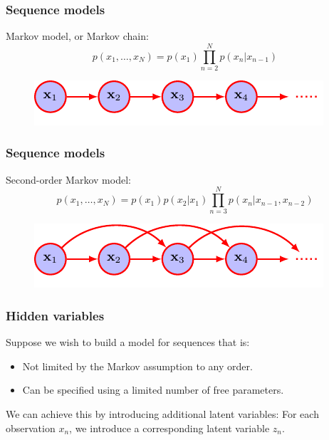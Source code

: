 \documentclass{beamer}
\begin{document}
\begin{frame}
    \frametitle{Sequence models}
    Markov model, or Markov chain:
    \begin{equation*}
        p(x_{1},\hdots,x_{N})=p(x_{1})\prod_{n=2}^{N}p(x_{n}|x_{n-1})
    \end{equation*}
    \begin{figure}
        \includegraphics{Figure_29.pdf}
    \end{figure}
\end{frame}

\begin{frame}
    \frametitle{Sequence models}
    Second-order Markov model:
    \begin{equation*}
        p(x_{1},\hdots,x_{N})=p(x_{1})p(x_{2}|x_{1})\prod_{n=3}^{N}p(x_{n}|x_{n-1},x_{n-2})
    \end{equation*}
    \begin{figure}
        \includegraphics{Figure_30.pdf}
    \end{figure}
\end{frame}

\begin{frame}
    \frametitle{Hidden variables}
    Suppose we wish to build a model for sequences that is:
    \begin{itemize}
        \item Not limited by the Markov assumption to any order.
        \item Can be specified using a limited number of free parameters.
    \end{itemize}
    We can achieve this by introducing additional latent variables: For each observation $x_{n}$, we introduce a corresponding latent variable $z_{n}$.
\end{frame}
\end{document}
